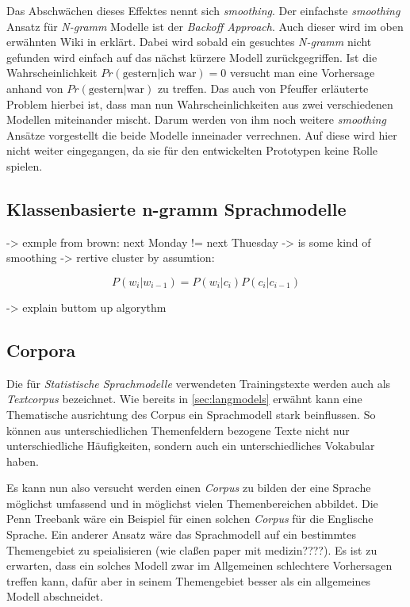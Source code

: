         Das Abschwächen dieses Effektes nennt sich \emph{smoothing}. Der einfachste \emph{smoothing} Ansatz für \emph{N-gramm} Modelle ist der \emph{Backoff Approach}. Auch dieser wird im oben erwähnten Wiki in \parencite{recognize-speech:backoff} erklärt. Dabei wird sobald ein gesuchtes \emph{N-gramm} nicht gefunden wird einfach auf das nächst kürzere Modell zurückgegriffen. Ist die Wahrscheinlichkeit \(Pr(\text{gestern}|\text{ich war}) = 0\) versucht man eine Vorhersage anhand von \(Pr(\text{gestern}|\text{war})\) zu treffen. Das auch von Pfeuffer erläuterte Problem hierbei ist, dass man nun Wahrscheinlichkeiten aus zwei verschiedenen Modellen miteinander mischt. Darum werden von ihm noch weitere \emph{smoothing} Ansätze vorgestellt die beide Modelle inneinader verrechnen. Auf diese wird hier nicht weiter eingegangen, da sie für den entwickelten Prototypen keine Rolle spielen.
        
    \newpage
	\subsection{Klassenbasierte n-gramm Sprachmodelle}
    \label{sec:brownClustering}
    
    	-> exmple from brown: next Monday != next Thuesday
        -> is some kind of smoothing
        -> rertive cluster by assumtion:
    
    	\begin{equation}
   			P(w_i|w_{i-1}) = P(w_i|c_i) P(c_i|c_{i-1})
        	\label{eq:wordPropability}
		\end{equation}
        
        -> explain buttom up algorythm
        
    \newpage    
    \subsection{Corpora}
    	Die für \emph{Statistische Sprachmodelle} verwendeten Trainingstexte werden auch als \emph{Textcorpus} bezeichnet. Wie bereits in \autoref{sec:langmodels} erwähnt kann eine Thematische ausrichtung des Corpus ein Sprachmodell stark beinflussen. So können aus unterschiedlichen Themenfeldern bezogene Texte nicht nur unterschiedliche Häufigkeiten, sondern auch ein unterschiedliches Vokabular haben.
        
        Es kann nun also versucht werden einen \emph{Corpus} zu bilden der eine Sprache möglichst umfassend und in möglichst vielen Themenbereichen abbildet. Die Penn Treebank wäre ein Beispiel für einen solchen \emph{Corpus} für die Englische Sprache. Ein anderer Ansatz wäre das Sprachmodell auf ein bestimmtes Themengebiet zu speialisieren (wie claßen paper mit medizin????). Es ist zu erwarten, dass ein solches Modell zwar im Allgemeinen schlechtere Vorhersagen treffen kann, dafür aber in seinem Themengebiet besser als ein allgemeines Modell abschneidet.
        
